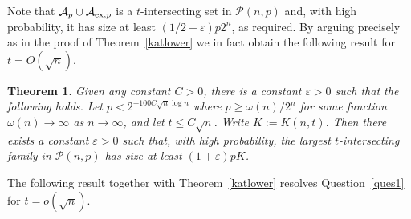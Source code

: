 \documentclass[11pt]{article}
\newtheorem{theorem}{Theorem}[section]
\numberwithin{equation}{section}
\def\P{\mathcal{P}}
\def\eps{\varepsilon}
\begin{document}
Note that $\mathcal A_p \cup \mathcal A_{{\rm ex}, p}$ is a $t$-intersecting set in $\P(n,p)$ and, with high probability, it has size at least  $(1/2+\eps)p2^n$, as required.
\endproof
By arguing precisely as in the proof of Theorem~\ref{katlower} we in fact obtain the following result for $t=O(\sqrt{n})$.
\begin{theorem}\label{katlower2}
Given any constant $C >0$, there is a constant $\eps>0$ such that the following holds.
Let $p<2^{-100C\sqrt{n}\log n}$ where $p\geq \omega (n)/2^{n}$ for some function $\omega (n)\rightarrow \infty$ as $n \rightarrow \infty$, and let $t\leq C\sqrt{n}$. Write $K:=K(n,t)$. Then there exists a constant $\eps>0$ such that, with high probability, the largest $t$-intersecting family in $\mathcal P(n,p)$ has size at least $(1+\eps)pK$.
\end{theorem}





The following result together with Theorem~\ref{katlower} resolves Question~\ref{ques1} for $t=o(\sqrt{n})$.
\end{document}

